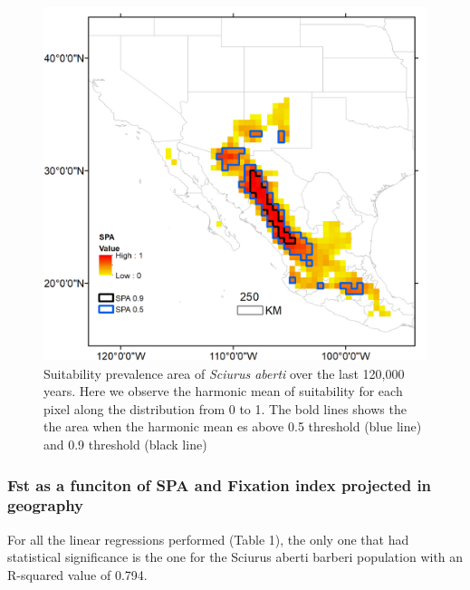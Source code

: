 \documentclass[
]{article}
\begin{document}
\begin{figure}
\centering
\includegraphics{all_figures/figure_4.png}
\caption{Suitability prevalence area of \textit{Sciurus aberti} over the last 120,000 years. Here we observe the harmonic mean
of suitability for each pixel along the distribution from 0 to 1. The
bold lines shows the the area when the harmonic mean es above 0.5
threshold (blue line) and 0.9 threshold (black line)}
\end{figure}

\hypertarget{fst-as-a-funciton-of-spa-and-fixation-index-projected-in-geography}{%
\subsubsection{Fst as a funciton of SPA and Fixation index projected in
geography}\label{fst-as-a-funciton-of-spa-and-fixation-index-projected-in-geography}}

For all the linear regressions performed (Table 1), the only one that
had statistical significance is the one for the Sciurus aberti barberi
population with an R-squared value of 0.794.
\end{document}
